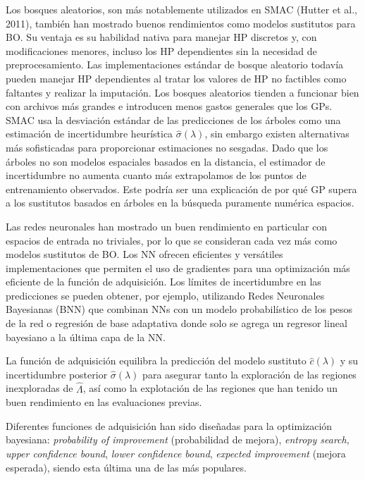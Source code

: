 Los bosques aleatorios, son más notablemente utilizados en SMAC (Hutter et al., 2011), también han mostrado buenos rendimientos como modelos sustitutos para BO. Su ventaja es su habilidad nativa para manejar HP discretos y, con modificaciones menores, incluso los HP dependientes sin la necesidad de preprocesamiento. Las implementaciones estándar de bosque aleatorio todavía pueden manejar HP dependientes al tratar los valores de HP no factibles como faltantes y realizar la imputación. Los bosques aleatorios tienden a funcionar bien con archivos más grandes e introducen menos gastos generales que los GPs. SMAC usa la desviación estándar de las predicciones de los árboles como una estimación de incertidumbre heurística $\hat{\sigma}(\lambda)$,  sin embargo existen alternativas más sofisticadas para proporcionar estimaciones no sesgadas. Dado que los árboles no son modelos espaciales basados en la distancia, el estimador de incertidumbre no aumenta cuanto más extrapolamos de los puntos de entrenamiento observados. Este podría ser una explicación de por qué GP supera a los sustitutos basados en árboles en la búsqueda puramente numérica espacios.

Las redes neuronales han mostrado un buen rendimiento en particular con espacios de entrada no triviales, por lo que se consideran cada vez más como modelos sustitutos de BO. Los NN ofrecen eficientes y versátiles implementaciones que permiten el uso de gradientes para una optimización más eficiente de la función de adquisición. Los límites de incertidumbre en las predicciones se pueden obtener, por ejemplo, utilizando Redes Neuronales Bayesianas (BNN) que combinan NNs con un modelo probabilístico de los pesos de la red o regresión de base adaptativa donde solo se agrega un regresor lineal bayesiano a la última capa de la NN.

La función de adquisición equilibra la predicción del modelo sustituto $\hat{c}(\lambda)$ y su incertidumbre posterior $\hat{\sigma}(\lambda)$ para asegurar tanto la exploración de las regiones inexploradas de $\hat{\varLambda}$, así como la explotación de las regiones que han tenido un buen rendimiento en las evaluaciones previas.

Diferentes funciones de adquisición han sido diseñadas para la optimización bayesiana: \textit{probability of improvement} (probabilidad de mejora), \textit{entropy search}, \textit{upper confidence bound}, \textit{lower confidence bound}, \textit{expected improvement} (mejora esperada), siendo esta última una de las más populares.

